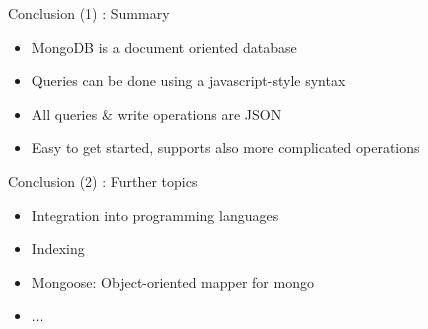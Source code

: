 \begin{frame}{Conclusion (1) : Summary}
    \begin{itemize}
      \item MongoDB is a document oriented database
      \item Queries can be done using a javascript-style syntax
      \item All queries \& write operations are JSON
      \item Easy to get started, supports also more complicated operations
    \end{itemize}
\end{frame}

\begin{frame}{Conclusion (2) : Further topics}
    \begin{itemize}
      \item Integration into programming languages
      \item Indexing
      \item Mongoose: Object-oriented mapper for mongo
      \item $\dots$
    \end{itemize}
\end{frame}
